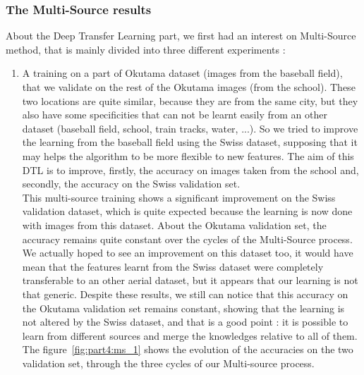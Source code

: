 \subsubsection{The Multi-Source results}
About the Deep Transfer Learning part, we first had an interest on Multi-Source method, that is mainly divided into three different experiments :
\begin{enumerate}
\item A training on a part of Okutama dataset (images from the baseball field), that we validate on the rest of the Okutama images (from the school). These two locations are quite similar, because they are from the same city, but they also have some specificities that can not be learnt easily from an other dataset (baseball field, school, train tracks, water, ...). So we tried to improve the learning from the baseball field using the Swiss dataset, supposing that it may helps the algorithm to be more flexible to new features. The aim of this DTL is to improve, firstly, the accuracy on images taken from the school and, secondly, the accuracy on the Swiss validation set. \\
This multi-source training shows a significant improvement on the Swiss validation dataset, which is quite expected because the learning is now done with images from this dataset. About the Okutama validation set, the accuracy remains quite constant over the cycles of the Multi-Source process. We actually hoped to see an improvement on this dataset too, it would have mean that the features learnt from the Swiss dataset were completely transferable to an other aerial dataset, but it appears that our learning is not that generic. Despite these results, we still can notice that this accuracy on the Okutama validation set remains constant, showing that the learning is not altered by the Swiss dataset, and that is a good point : it is possible to learn from different sources and merge the knowledges relative to all of them. \\
The figure~\ref{fig:part4:ms_1} shows the evolution of the accuracies on the two validation set, through the three cycles of our Multi-source process.


\end{enumerate}
